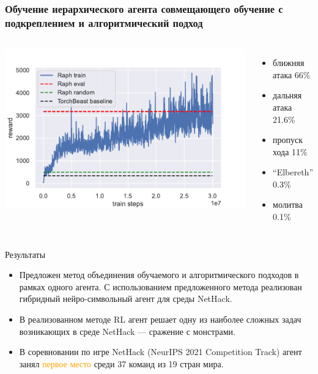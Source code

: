 \begin{frame}
\frametitle{Обучение иерархического агента совмещающего обучение с подкреплением и алгоритмический подход}
\begin{columns}
\centering
\includegraphics[width=1\linewidth]{images/raph_train.pdf}
\begin{itemize}
    \item ближняя атака 66\%
    \item дальняя атака 21.6\%
    \item пропуск хода 11\%
    \item ``Elbereth'' 0.3\%
    \item молитва 0.1\%
\end{itemize}
\end{columns}
\end{frame}


\begin{frame}{Результаты}
\begin{itemize}
    \item[\textcolor{ForestGreen}{\checkmark}] Предложен метод объединения обучаемого и алгоритмического подходов в рамках одного агента. С использованием предложенного метода реализован гибридный нейро-символьный агент для среды NetHack.
    \item[\textcolor{ForestGreen}{\checkmark}] В реализованном методе RL агент решает одну из наиболее сложных задач возникающих в среде NetHack — сражение с монстрами.
    \item[\textcolor{ForestGreen}{\checkmark}] В соревновании по игре NetHack (NeurIPS 2021 Competition Track) агент занял \textcolor{orange}{первое место} среди 37 команд из 19 стран мира.
\end{itemize}
    
\end{frame}

